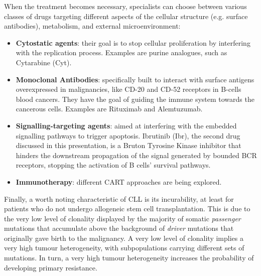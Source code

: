 When the treatment becomes necessary, specialists can choose between various classes of drugs targeting different aspects of the cellular structure (e.g. surface antibodies), metabolism, and external microenvironment:
\begin{itemize}
	\item \textbf{Cytostatic agents}: their goal is to stop cellular proliferation by interfering with the replication process. Examples are purine analogues, such as Cytarabine (Cyt).
	\item \textbf{Monoclonal Antibodies}: specifically built to interact with surface antigens overexpressed in malignancies, like CD-20 and CD-52 receptors in B-cells blood cancers. They have the goal of guiding the immune system towards the cancerous cells. Examples are Rituximab and Alemtuzumab.
	\item \textbf{Signalling-targeting agents}: aimed at interfering with the embedded signalling pathways to trigger apoptosis. Ibrutinib (Ibr), the second drug discussed in this presentation, is a Bruton Tyrosine Kinase inhibitor that hinders the downstream propagation of the signal generated by bounded BCR receptors, stopping the activation of B cells' survival pathways. 
	\item \textbf{Immunotherapy}: different CART approaches are being explored.
\end{itemize} \par
\vspace{0.4cm}
Finally, a worth noting characteristic of CLL is its incurability, at least for patients who do not undergo allogeneic stem cell transplantation. This is due to the very low level of clonality displayed by the majority of somatic \textit{passenger} mutations that accumulate above the background of \textit{driver} mutations that originally gave birth to the malignancy. A very low level of clonality implies a very high tumour heterogeneity, with subpopulations carrying different sets of mutations. In turn, a very high tumour heterogeneity increases the probability of developing primary resistance. \par


